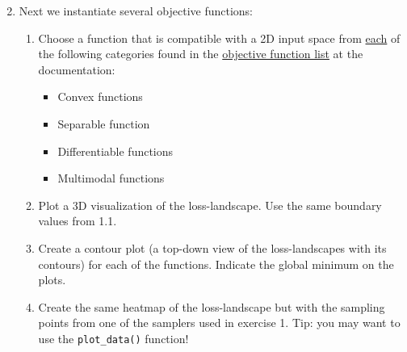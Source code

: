 \documentclass[10pt,a4paper,twoside]{article} %
\def\code#1{\texttt{#1}}
\begin{document}
\begin{enumerate}
	\setcounter{enumi}{1}
	\item Next we instantiate several objective functions:
	\begin{enumerate} [label*=\arabic*.]
		\item Choose a function that is compatible with a 2D input space from \underline{each} of the following categories found in the \href{https://bessagroup.github.io/F3DASM/capabilities/functions.html\#implemented-benchmark-functions}{objective function list} at the documentation:
		\begin{itemize}
			\item Convex functions
			\item Separable function
			\item Differentiable functions
			\item Multimodal functions
		\end{itemize}
	
	
		\item Plot a 3D visualization of the loss-landscape. Use the same boundary values from 1.1.
		\item Create a contour plot (a top-down view of the loss-landscapes with its contours) for each of the functions. Indicate the global minimum on the plots.
		\item Create the same heatmap of the loss-landscape but with the sampling points from one of the samplers used in exercise 1. Tip: you may want to use the \code{plot\_data()} function!
	
	\end{enumerate}
\end{enumerate}
\end{document}
